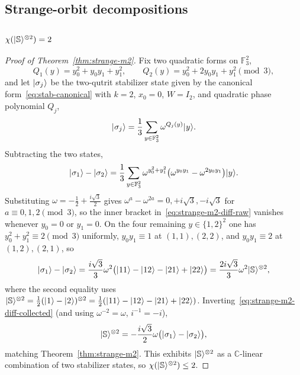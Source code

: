\documentclass[11pt]{article}
\theoremstyle{definition}
\newcommand{\microspace}{\mspace{0.5mu}}
\newcommand{\ket}[1]{\lvert\microspace #1 \microspace \rangle}
\newcommand{\complex}{\mathbb{C}}
\newcommand{\F}{\mathcal{F}}
\renewcommand{\F}[1]{\mathbb{F}_{#1}}
\newcommand{\chiR}{\chi}
\newcommand{\Strange}{\ket{\mathbb{S}}}
\begin{document}
	\subsection{\texorpdfstring{Strange-orbit decompositions}{Strange-orbit decompositions}}\label{app:strange}
	
	\subsubsection{\texorpdfstring{$\chiR(\Strange^{\otimes 2}) = 2$}{chi(S tensor 2) = 2}}\label{app:strange-m2}
	
	\begin{proof}[Proof of Theorem~\ref{thm:strange-m2}]
		Fix two quadratic forms on $\F{3}^2$,
		\begin{equation}\label{eq:strange-m2-Qs}
			Q_1(y) = y_0^2 + y_0 y_1 + y_1^2, \qquad
			Q_2(y) = y_0^2 + 2 y_0 y_1 + y_1^2 \pmod 3,
		\end{equation}
		and let $\ket{\sigma_j}$ be the two-qutrit stabilizer state given
		by the canonical form~\eqref{eq:stab-canonical} with $k = 2$,
		$x_0 = 0$, $W = I_2$, and quadratic phase polynomial $Q_j$,
		\begin{equation}\label{eq:strange-m2-sigma}
			\ket{\sigma_j} = \frac{1}{3} \sum_{y \in \F{3}^2}
			\omega^{Q_j(y)} \ket{y}.
		\end{equation}
		Subtracting the two states,
		\begin{equation}\label{eq:strange-m2-diff-raw}
			\ket{\sigma_1} - \ket{\sigma_2}
			= \frac{1}{3} \sum_{y \in \F{3}^2} \omega^{y_0^2 + y_1^2}
			\big( \omega^{y_0 y_1} - \omega^{2 y_0 y_1} \big) \ket{y}.
		\end{equation}
		Substituting $\omega = -\frac{1}{2} + \frac{i \sqrt{3}}{2}$ gives
		$\omega^a - \omega^{2a} = 0, +i\sqrt{3}, -i\sqrt{3}$ for
		$a \equiv 0, 1, 2 \pmod 3$, so the inner bracket
		in~\eqref{eq:strange-m2-diff-raw} vanishes whenever $y_0 = 0$ or
		$y_1 = 0$. On the four remaining $y \in \{1, 2\}^2$ one has
		$y_0^2 + y_1^2 \equiv 2 \pmod 3$ uniformly, $y_0 y_1 \equiv 1$ at
		$(1,1), (2,2)$, and $y_0 y_1 \equiv 2$ at $(1,2), (2,1)$, so
		\begin{equation}\label{eq:strange-m2-diff-collected}
			\ket{\sigma_1} - \ket{\sigma_2}
			= \frac{i \sqrt{3}}{3}  \omega^2 			\big( \ket{11} - \ket{12} - \ket{21} + \ket{22} \big)
			= \frac{2 i \sqrt{3}}{3}  \omega^2  \ket{\mathbb{S}}^{\otimes 2},
		\end{equation}
		where the second equality uses
		$\ket{\mathbb{S}}^{\otimes 2}
		= \frac{1}{2}(\ket{1} - \ket{2})^{\otimes 2}
		= \frac{1}{2}(\ket{11} - \ket{12} - \ket{21} + \ket{22})$.
		Inverting~\eqref{eq:strange-m2-diff-collected} (and using
		$\omega^{-2} = \omega$, $i^{-1} = -i$),
		\begin{equation}\label{eq:strange-m2-decomp}
			\ket{\mathbb{S}}^{\otimes 2}
			= -\frac{i \sqrt{3}}{2}  \omega  \big( \ket{\sigma_1} - \ket{\sigma_2} \big),
		\end{equation}
		matching Theorem~\ref{thm:strange-m2}.
		This exhibits $\ket{\mathbb{S}}^{\otimes 2}$ as a $\complex$-linear
		combination of two stabilizer states, so
		$\chiR(\ket{\mathbb{S}}^{\otimes 2}) \le 2$.
		

\end{proof}
\end{document}
